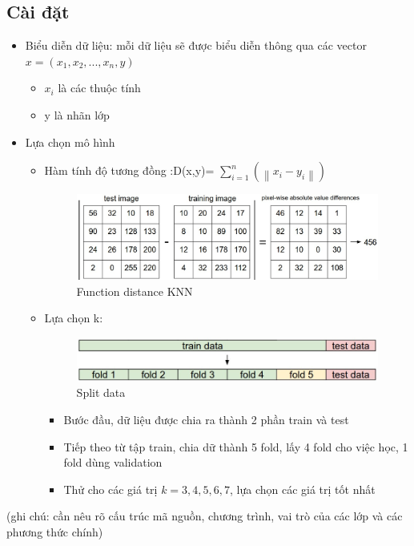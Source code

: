 \documentclass[a4paper,12pt]{report}
\begin{document}
\subsection{Cài đặt}
\begin{itemize}
\item Biểu diễn dữ liệu: mỗi dữ liệu sẽ được biểu diễn thông qua các vector $x=(x_1,x_2,...,x_n,y)$
\begin{itemize}
\item $x_i$ là các thuộc tính 
\item y là nhãn lớp
\end{itemize}
\item Lựa chọn mô hình
\begin{itemize}
\item Hàm tính độ tương đồng  :D(x,y)= $\sum_{i=1}^n(\left\|x_i - y_i\right\|)$
\begin{figure}[H]
\centering
\includegraphics[scale=0.4]{dknn.jpeg}
\caption{Function distance KNN}
\label{fig:knn}
\end{figure}
\item Lựa chọn k:
\begin{figure}[H]
\centering
\includegraphics[scale=0.4]{crossval.jpeg}
\caption{Split data}
\label{fig:splitdata}
\end{figure}
\begin{itemize}
\item Bước đầu, dữ liệu được chia ra thành 2 phần train và test
\item Tiếp theo từ tập train, chia dữ thành 5 fold, lấy 4 fold cho việc học, 1 fold dùng validation
\item Thử cho các giá trị  $k={3,4,5,6,7}$, lựa chọn các giá trị tốt nhất
\end{itemize}
\end{itemize}
\end{itemize}
(ghi chú: cần nêu rõ cấu trúc mã nguồn, chương trình, vai trò của các lớp và các phương thức chính)
\end{document}
